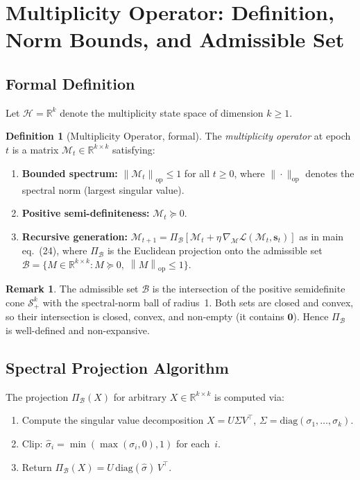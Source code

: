 \documentclass[12pt,letterpaper]{article}
\theoremstyle{plain}
\theoremstyle{definition}
\newtheorem{definition}[theorem]{Definition}
\newtheorem{remark}[theorem]{Remark}
\newcommand{\M}{\mathcal{M}}
\newcommand{\calB}{\mathcal{B}}
\newcommand{\calL}{\mathcal{L}}
\newcommand{\opnorm}[1]{\left\|#1\right\|_{\mathrm{op}}}
\newcommand{\R}{\mathbb{R}}
\begin{document}
\section{Multiplicity Operator: Definition, Norm Bounds,
         and Admissible Set}
\label{app:multiplicity}

\subsection{Formal Definition}

Let \(\mathcal{H} = \R^k\) denote the multiplicity state space of
dimension \(k \geq 1\).

\begin{definition}[Multiplicity Operator, formal]
\label{def:M_formal}
The \emph{multiplicity operator} at epoch \(t\) is a matrix
\(\M_t \in \R^{k \times k}\) satisfying:
\begin{enumerate}[label=(\roman*)]
  \item \textbf{Bounded spectrum:}
        \(\opnorm{\M_t} \leq 1\) for all \(t \geq 0\), where
        \(\|\cdot\|_{\mathrm{op}}\) denotes the spectral norm
        (largest singular value).
  \item \textbf{Positive semi-definiteness:}
        \(\M_t \succeq 0\).
  \item \textbf{Recursive generation:}
        \(\M_{t+1} = \Pi_{\calB}[\M_t + \eta\,\nabla_{\!\M}\calL(\M_t,\mathbf{s}_t)]\)
        as in main eq.~(24), where \(\Pi_{\calB}\) is the Euclidean
        projection onto the admissible set
        \(\calB = \{M \in \R^{k\times k} : M \succeq 0,\; \opnorm{M} \leq 1\}\).
\end{enumerate}
\end{definition}

\begin{remark}
The admissible set \(\calB\) is the intersection of the positive
semidefinite cone \(\mathcal{S}^k_+\) with the spectral-norm ball of
radius~1.  Both sets are closed and convex, so their intersection is
closed, convex, and non-empty (it contains \(\mathbf{0}\)).
Hence \(\Pi_{\calB}\) is well-defined and non-expansive.
\end{remark}

\subsection{Spectral Projection Algorithm}

The projection \(\Pi_{\calB}(X)\) for arbitrary \(X \in \R^{k\times k}\)
is computed via:
\begin{enumerate}[leftmargin=2em]
  \item Compute the singular value decomposition
        \(X = U \Sigma V^\top\),\quad
        \(\Sigma = \mathrm{diag}(\sigma_1, \ldots, \sigma_k)\).
  \item Clip: \(\hat\sigma_i = \min(\max(\sigma_i, 0), 1)\) for each~\(i\).
  \item Return \(\Pi_{\calB}(X) = U\,\mathrm{diag}(\hat\sigma)\,V^\top\).
\end{enumerate}
\end{document}
